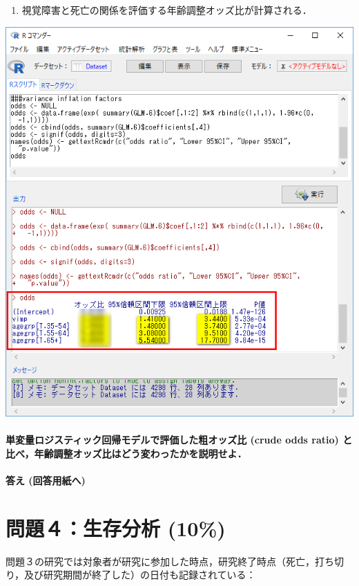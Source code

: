 \documentclass[11pt,]{problemset}
\providecommand{\tightlist}{%
  \setlength{\itemsep}{0pt}\setlength{\parskip}{0pt}}
\let\oldparagraph\paragraph
\renewcommand{\paragraph}[1]{\oldparagraph{#1}\mbox{}}
\begin{document}
\newpage

\begin{enumerate}
\def\labelenumi{\arabic{enumi}.}
\setcounter{enumi}{3}
\tightlist
\item
  視覚障害と死亡の関係を評価する年齢調整オッズ比が計算される．
\end{enumerate}

\begin{center}\includegraphics[width=0.5\linewidth,height=0.5\textheight]{pic/mltlogstic07cut} \end{center}

\hypertarget{-crude-odds-ratio-}{%
\paragraph{単変量ロジスティック回帰モデルで評価した粗オッズ比 (crude
odds ratio)
と比べ，年齢調整オッズ比はどう変わったかを説明せよ．}\label{-crude-odds-ratio-}}

\hypertarget{--7}{%
\paragraph{答え (回答用紙へ)}\label{--7}}

\newpage

\hypertarget{-10}{%
\section{問題４：生存分析 (10\%)}\label{-10}}

問題３の研究では対象者が研究に参加した時点，研究終了時点（死亡，打ち切り，及び研究期間が終了した）の日付も記録されている：
\end{document}
